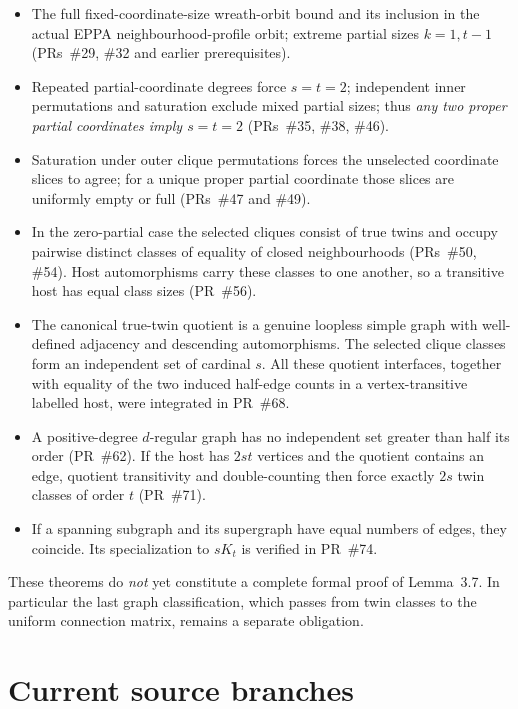 \documentclass[11pt,a4paper]{article}
\begin{document}
\begin{itemize}
\item The full fixed-coordinate-size wreath-orbit bound and its
  inclusion in the actual EPPA neighbourhood-profile orbit;
  extreme partial sizes \(k=1,t-1\)
  (PRs~\#29, \#32 and earlier prerequisites).
\item Repeated partial-coordinate degrees force \(s=t=2\);
  independent inner permutations and saturation exclude
  mixed partial sizes; thus \emph{any two proper partial
  coordinates imply \(s=t=2\)}
  (PRs~\#35, \#38, \#46).
\item Saturation under outer clique permutations forces the
  unselected coordinate slices to agree; for a unique proper
  partial coordinate those slices are uniformly empty or full
  (PRs~\#47 and \#49).
\item In the zero-partial case the selected cliques consist of
  true twins and occupy pairwise distinct classes of equality
  of closed neighbourhoods (PRs~\#50, \#54).
  Host automorphisms carry these classes to one another,
  so a transitive host has equal class sizes
  (PR~\#56).
\item The canonical true-twin quotient is a genuine loopless
  simple graph with well-defined adjacency and descending
  automorphisms. The selected clique classes form an
  independent set of cardinal \(s\). All these quotient
  interfaces, together with equality of the two induced
  half-edge counts in a vertex-transitive labelled host,
  were integrated in PR~\#68.
\item A positive-degree \(d\)-regular graph has no independent
  set greater than half its order (PR~\#62).
  If the host has \(2st\) vertices and the quotient contains an edge,
  quotient transitivity and double-counting then force
  exactly \(2s\) twin classes of order \(t\)
  (PR~\#71).
\item If a spanning subgraph and its supergraph have equal
  numbers of edges, they coincide. Its specialization to
  \(sK_t\) is verified in PR~\#74.
\end{itemize}

These theorems do \emph{not} yet constitute a complete
formal proof of Lemma~3.7. In particular the last graph
classification, which passes from twin classes to the
uniform connection matrix, remains a separate obligation.

\section*{Current source branches}
\end{document}
